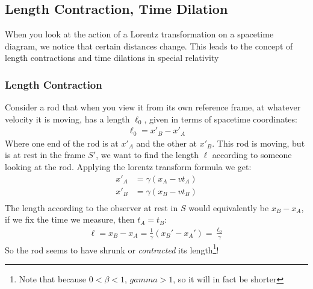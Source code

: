 \documentclass[12pt]{article}
\begin{document}
\subsection{Length Contraction, Time Dilation}
When you look at the action of a Lorentz transformation on a spacetime diagram, we notice that certain distances change. This leads to the concept of length contractions and time dilations in special relativity

\subsubsection{Length Contraction}
Consider a rod that when you view it from its own reference frame, at whatever velocity it is moving, has a length $\ell_0$, given in terms of spacetime coordinates:
\begin{align*}
  \ell_0=x'_B-x'_A
\end{align*}
Where one end of the rod is at $x'_A$ and the other at $x'_B$. This rod is moving, but is at rest in the frame $S'$, we want to find the length $\ell$ according to someone looking at the rod. Applying the lorentz transform formula we get:
\begin{align*}
  x'_A&=\gamma(x_A-vt_A)\\
  x'_B&=\gamma(x_B-vt_B)\\
\end{align*}
The length according to the observer at rest in $S$ would equivalently be $x_B-x_A$, if we fix the time we measure, then $t_A=t_B$:
\begin{align*}
  \ell = x_B-x_A = \frac{1}{\gamma}(x_B'-x_A')=\frac{\ell_0}{\gamma}
\end{align*}
So the rod seems to have shrunk or \emph{contracted} its length\footnote{Note that because $0<\beta<1$, $gamma>1$, so it will in fact be shorter}!
\end{document}
